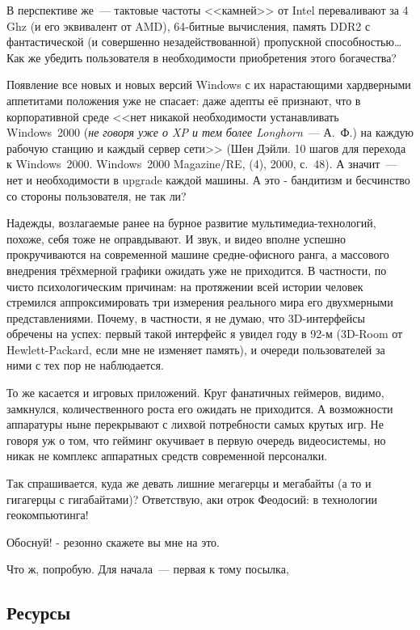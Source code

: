 В перспективе же~--- тактовые частоты <<камней>> от Intel переваливают за 4 Ghz (и его эквивалент от AMD), 64-битные вычисления, память DDR2 с фантастической (и совершенно незадействованной) пропускной способностью\dots Как же убедить пользователя в необходимости приобретения этого богачества?

Появление все новых и новых версий Windows с их нарастающими хардверными аппетитами положения уже не спасает: даже адепты её признают, что в корпоративной среде <<нет никакой необходимости устанавливать Windows~2000 (\textit{не говоря уже о XP и тем более Longhorn}~--- А.~Ф.) на каждую рабочую станцию и каждый сервер сети>> (Шен Дэйли. 10 шагов для перехода к Windows~2000. Windows~2000 Magazine/RE, (4), 2000, с.~48). А значит~--- нет и необходимости в upgrade каждой машины. А это - бандитизм и бесчинство со стороны пользователя, не так ли?

Надежды, возлагаемые ранее на бурное развитие мультимедиа-технологий, похоже, себя тоже не оправдывают. И звук, и видео вполне успешно прокручиваются на современной машине средне-офисного ранга, а массового внедрения трёхмерной графики ожидать уже не приходится. В частности, по чисто психологическим причинам: на протяжении всей истории человек стремился аппроксимировать три измерения реального мира его двухмерными представлениями. Почему, в частности, я не думаю, что 3D-интерфейсы обречены на успех: первый такой интерфейс я увидел году в 92-м (3D-Room от Hewlett-Packard, если мне не изменяет память), и очереди пользователей за ними с тех пор не наблюдается.

То же касается и игровых приложений. Круг фанатичных геймеров, видимо, замкнулся, количественного роста его ожидать не приходится. А возможности аппаратуры ныне перекрывают с лихвой потребности самых крутых игр. Не говоря уж о том, что гейминг окучивает в первую очередь видеосистемы, но никак не комплекс аппаратных средств современной персоналки.

Так спрашивается, куда же девать лишние мегагерцы и мегабайты (а то и гигагерцы с гигабайтами)? Ответствую, аки отрок Феодосий: в технологии геокомпьютинга!

Обоснуй! - резонно скажете вы мне на это.

Что ж, попробую. Для начала~--- первая к тому посылка,

\subsection{Ресурсы}

